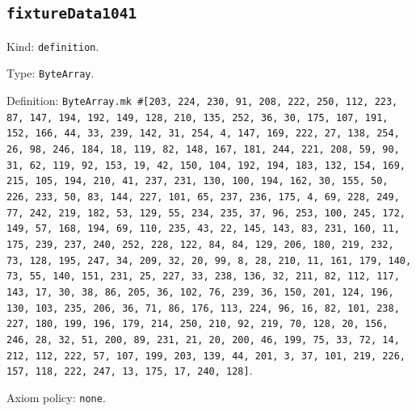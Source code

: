 \documentclass[11pt]{article}
\begin{document}
\subsection*{\texttt{fixtureData1041}}
\noindent Kind: \texttt{definition}.\par
\noindent Type: \texttt{ByteArray}.\par
\noindent Definition: \texttt{ByteArray.mk \#[203, 224, 230, 91, 208, 222, 250, 112, 223, 87, 147, 194, 192, 149, 128, 210, 135, 252, 36, 30, 175, 107, 191, 152, 166, 44, 33, 239, 142, 31, 254, 4, 147, 169, 222, 27, 138, 254, 26, 98, 246, 184, 18, 119, 82, 148, 167, 181, 244, 221, 208, 59, 90, 31, 62, 119, 92, 153, 19, 42, 150, 104, 192, 194, 183, 132, 154, 169, 215, 105, 194, 210, 41, 237, 231, 130, 100, 194, 162, 30, 155, 50, 226, 233, 50, 83, 144, 227, 101, 65, 237, 236, 175, 4, 69, 228, 249, 77, 242, 219, 182, 53, 129, 55, 234, 235, 37, 96, 253, 100, 245, 172, 149, 57, 168, 194, 69, 110, 235, 43, 22, 145, 143, 83, 231, 160, 11, 175, 239, 237, 240, 252, 228, 122, 84, 84, 129, 206, 180, 219, 232, 73, 128, 195, 247, 34, 209, 32, 20, 99, 8, 28, 210, 11, 161, 179, 140, 73, 55, 140, 151, 231, 25, 227, 33, 238, 136, 32, 211, 82, 112, 117, 143, 17, 30, 38, 86, 205, 36, 102, 76, 239, 36, 150, 201, 124, 196, 130, 103, 235, 206, 36, 71, 86, 176, 113, 224, 96, 16, 82, 101, 238, 227, 180, 199, 196, 179, 214, 250, 210, 92, 219, 70, 128, 20, 156, 246, 28, 32, 51, 200, 89, 231, 21, 20, 200, 46, 199, 75, 33, 72, 14, 212, 112, 222, 57, 107, 199, 203, 139, 44, 201, 3, 37, 101, 219, 226, 157, 118, 222, 247, 13, 175, 17, 240, 128]}.\par
\noindent Axiom policy: \texttt{none}.\par
\end{document}
